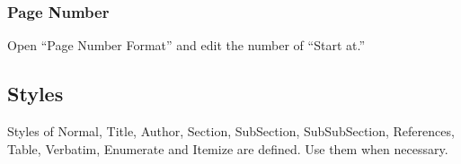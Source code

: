\documentclass[a4paper,twoside,twocolumn,10pt]{article}
\begin{document}
\subsubsection{Page Number}
Open ``Page Number Format'' and edit the number of ``Start at.''

\subsection{Styles}
Styles of Normal, Title, Author, Section, SubSection, SubSubSection, References, Table, Verbatim, Enumerate and Itemize are defined.
Use them when necessary.




\end{document}
